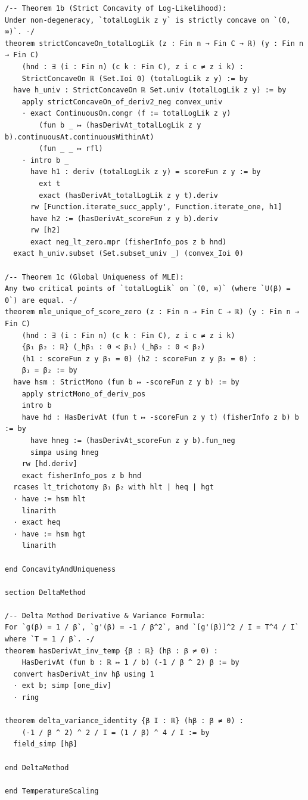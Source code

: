 {\begin{verbatim}
/-- Theorem 1b (Strict Concavity of Log-Likelihood):
Under non-degeneracy, `totalLogLik z y` is strictly concave on `(0, ∞)`. -/
theorem strictConcaveOn_totalLogLik (z : Fin n → Fin C → ℝ) (y : Fin n → Fin C)
    (hnd : ∃ (i : Fin n) (c k : Fin C), z i c ≠ z i k) :
    StrictConcaveOn ℝ (Set.Ioi 0) (totalLogLik z y) := by
  have h_univ : StrictConcaveOn ℝ Set.univ (totalLogLik z y) := by
    apply strictConcaveOn_of_deriv2_neg convex_univ
    · exact ContinuousOn.congr (f := totalLogLik z y)
        (fun b _ ↦ (hasDerivAt_totalLogLik z y b).continuousAt.continuousWithinAt)
        (fun _ _ ↦ rfl)
    · intro b _
      have h1 : deriv (totalLogLik z y) = scoreFun z y := by
        ext t
        exact (hasDerivAt_totalLogLik z y t).deriv
      rw [Function.iterate_succ_apply', Function.iterate_one, h1]
      have h2 := (hasDerivAt_scoreFun z y b).deriv
      rw [h2]
      exact neg_lt_zero.mpr (fisherInfo_pos z b hnd)
  exact h_univ.subset (Set.subset_univ _) (convex_Ioi 0)

/-- Theorem 1c (Global Uniqueness of MLE):
Any two critical points of `totalLogLik` on `(0, ∞)` (where `U(β) = 0`) are equal. -/
theorem mle_unique_of_score_zero (z : Fin n → Fin C → ℝ) (y : Fin n → Fin C)
    (hnd : ∃ (i : Fin n) (c k : Fin C), z i c ≠ z i k)
    {β₁ β₂ : ℝ} (_hβ₁ : 0 < β₁) (_hβ₂ : 0 < β₂)
    (h1 : scoreFun z y β₁ = 0) (h2 : scoreFun z y β₂ = 0) :
    β₁ = β₂ := by
  have hsm : StrictMono (fun b ↦ -scoreFun z y b) := by
    apply strictMono_of_deriv_pos
    intro b
    have hd : HasDerivAt (fun t ↦ -scoreFun z y t) (fisherInfo z b) b := by
      have hneg := (hasDerivAt_scoreFun z y b).fun_neg
      simpa using hneg
    rw [hd.deriv]
    exact fisherInfo_pos z b hnd
  rcases lt_trichotomy β₁ β₂ with hlt | heq | hgt
  · have := hsm hlt
    linarith
  · exact heq
  · have := hsm hgt
    linarith

end ConcavityAndUniqueness

section DeltaMethod

/-- Delta Method Derivative & Variance Formula:
For `g(β) = 1 / β`, `g'(β) = -1 / β^2`, and `[g'(β)]^2 / I = T^4 / I` where `T = 1 / β`. -/
theorem hasDerivAt_inv_temp {β : ℝ} (hβ : β ≠ 0) :
    HasDerivAt (fun b : ℝ ↦ 1 / b) (-1 / β ^ 2) β := by
  convert hasDerivAt_inv hβ using 1
  · ext b; simp [one_div]
  · ring

theorem delta_variance_identity {β I : ℝ} (hβ : β ≠ 0) :
    (-1 / β ^ 2) ^ 2 / I = (1 / β) ^ 4 / I := by
  field_simp [hβ]

end DeltaMethod

end TemperatureScaling
\end{verbatim}
}
